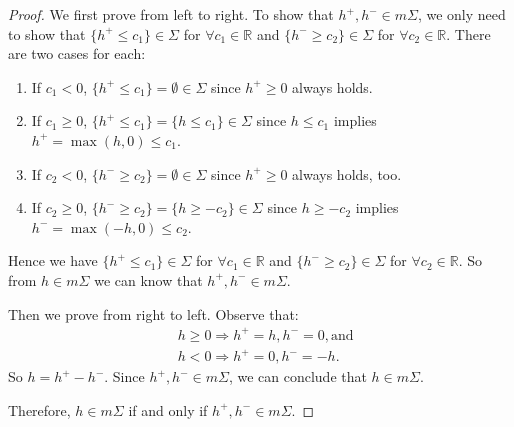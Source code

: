 \documentclass[a4paper, linespread=1.5]{article}
\newcommand{\Real}{\mathbb{R}}
\begin{document}
    \begin{proof}
        We first prove from left to right. To show that $h^+, h^- \in m\Sigma$, we only need to show that $\{h^+ \leqslant c_1\} \in \Sigma$ for $\forall c_1 \in \Real$ and $\{h^- \geqslant c_2\} \in \Sigma$ for $\forall c_2 \in \Real$. There are two cases for each:
        \begin{enumerate}
            \item If $c_1 < 0$, $\{h^+ \leqslant c_1\} = \emptyset \in \Sigma$ since $h^+ \geqslant 0$ always holds.
            \item If $c_1 \geqslant 0$, $\{h^+ \leqslant c_1\} = \{h \leqslant c_1\} \in \Sigma$ since $h \leqslant c_1$ implies $h^+ = \max(h, 0) \leqslant c_1$.
            \item If $c_2 < 0$, $\{h^- \geqslant c_2\} = \emptyset \in \Sigma$ since $h^+ \geqslant 0$ always holds, too.
            \item If $c_2 \geqslant 0$, $\{h^- \geqslant c_2\} = \{h \geqslant -c_2\} \in \Sigma$ since $h \geqslant -c_2$ implies $h^- = \max(-h, 0) \leqslant c_2$.
        \end{enumerate}
        Hence we have $\{h^+ \leqslant c_1\} \in \Sigma$ for $\forall c_1 \in \Real$ and $\{h^- \geqslant c_2\} \in \Sigma$ for $\forall c_2 \in \Real$. So from $h \in m\Sigma$ we can know that $h^+, h^- \in m\Sigma$.
        
        Then we prove from right to left. Observe that:
        $$
        \begin{aligned}
            & h \geqslant 0 \Rightarrow h^+ = h, h^- = 0, \textrm{and} \\
            & h < 0 \Rightarrow h^+ = 0, h^- = -h.
        \end{aligned}
        $$
        So $h = h^+ - h^-$. Since $h^+, h^- \in m\Sigma$, we can conclude that $h \in m\Sigma$.
        
        Therefore, $h \in m\Sigma$ if and only if $h^+, h^- \in m\Sigma$.
    \end{proof}
\end{document}
